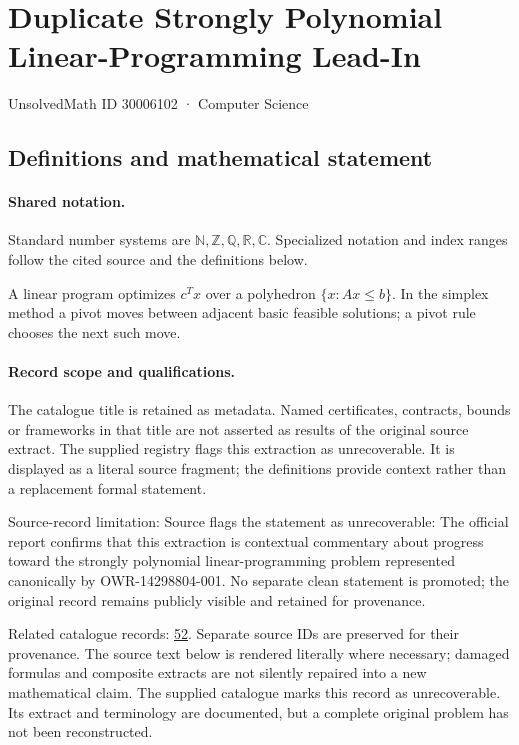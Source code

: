 \documentclass[11pt]{article}
\begin{document}
\setcounter{section}{30006101}
\section{Duplicate Strongly Polynomial Linear-Programming Lead-In}\label{30006102}
{\small\sffamily UnsolvedMath ID 30006102 · Computer Science}
\subsection{Definitions and mathematical statement}

\paragraph{Shared notation.}Standard number systems are $\mathbb N,\mathbb Z,\mathbb Q,\mathbb R,\mathbb C$. Specialized notation and index ranges follow the cited source and the definitions below.


A linear program optimizes $c^Tx$ over a polyhedron $\{x:Ax\leq b\}$. In the simplex method a pivot moves between adjacent basic feasible solutions; a pivot rule chooses the next such move.
\paragraph{Record scope and qualifications.}
The catalogue title is retained as metadata. Named certificates, contracts, bounds or frameworks in that title are not asserted as results of the original source extract.
The supplied registry flags this extraction as unrecoverable. It is displayed as a literal source fragment; the definitions provide context rather than a replacement formal statement.

Source-record limitation: Source flags the statement as unrecoverable: The official report confirms that this extraction is contextual commentary about progress toward the strongly polynomial linear-programming problem represented canonically by OWR-14298804-001. No separate clean statement is promoted; the original record remains publicly visible and retained for provenance.

Related catalogue records: \href{https://mehmetmars7.github.io/Erdosproblems-llm-hunter/problem.html?type=open_problems&id=52}{52}. Separate source IDs are preserved for their provenance.
The source text below is rendered literally where necessary; damaged formulas and composite extracts are not silently repaired into a new mathematical claim.
The supplied catalogue marks this record as unrecoverable. Its extract and terminology are documented, but a complete original problem has not been reconstructed.
\end{document}
